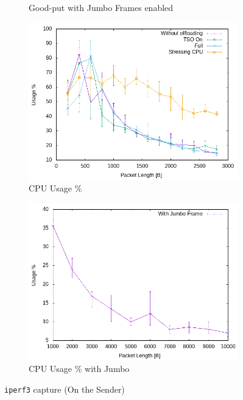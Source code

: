 \documentclass{exam}
\begin{document}
\begin{figure}[H]
\begin{subfigure}[b]{0.40\textwidth}
        \caption{Good-put with Jumbo Frames enabled}
        \label{fig:good-j}
    \end{subfigure}
    \hfill
    \begin{subfigure}[b]{0.40\textwidth}
        \centering
        \includegraphics[width=\textwidth]{iperf/cpu.png}
        \caption{CPU Usage \%}
        \label{fig:cpu}
    \end{subfigure}
    \hfill
    \begin{subfigure}[b]{0.40\textwidth}
        \centering
        \includegraphics[width=\textwidth]{iperf/cpu_j.png}
        \caption{CPU Usage \% with Jumbo}
        \label{fig:cpu-j}
    \end{subfigure}

    \caption{\texttt{iperf3} capture (On the Sender)}
\end{figure}
\end{document}
